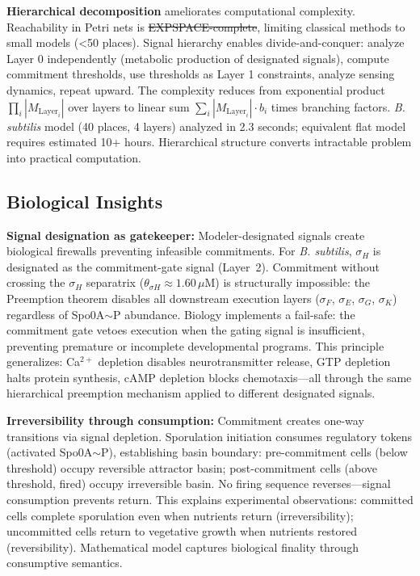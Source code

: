 \documentclass[10pt,letterpaper]{article}
\providecommand{\DIFaddtex}[1]{{\protect\color{blue}\uwave{#1}}} %
\providecommand{\DIFdeltex}[1]{{\protect\color{red}\sout{#1}}}                      %
\providecommand{\DIFaddbegin}{} %
\providecommand{\DIFaddend}{} %
\providecommand{\DIFdelbegin}{} %
\providecommand{\DIFdelend}{} %
\providecommand{\DIFadd}[1]{\texorpdfstring{\DIFaddtex{#1}}{#1}} %
\providecommand{\DIFdel}[1]{\texorpdfstring{\DIFdeltex{#1}}{}} %
\newcommand{\DIFscaledelfig}{0.5}
\newlength{\DIFdelgraphicswidth} %
\newlength{\DIFdelgraphicsheight} %
\newcommand{\DIFaddincludegraphics}[2][]{{\color{blue}\fbox{\DIFOincludegraphics[#1]{#2}}}} %
\newcommand{\DIFdelincludegraphics}[2][]{%
\sbox{\DIFdelgraphicsbox}{\DIFOincludegraphics[#1]{#2}}%
\settoboxwidth{\DIFdelgraphicswidth}{\DIFdelgraphicsbox} %
\settoboxtotalheight{\DIFdelgraphicsheight}{\DIFdelgraphicsbox} %
\scalebox{\DIFscaledelfig}{%
\parbox[b]{\DIFdelgraphicswidth}{\usebox{\DIFdelgraphicsbox}\\[-\baselineskip] \rule{\DIFdelgraphicswidth}{0em}}\llap{\resizebox{\DIFdelgraphicswidth}{\DIFdelgraphicsheight}{%
\setlength{\unitlength}{\DIFdelgraphicswidth}%
\begin{picture}(1,1)%
\thicklines\linethickness{2pt} %
{\color[rgb]{1,0,0}\put(0,0){\framebox(1,1){}}}%
{\color[rgb]{1,0,0}\put(0,0){\line( 1,1){1}}}%
{\color[rgb]{1,0,0}\put(0,1){\line(1,-1){1}}}%
\end{picture}%
}\hspace*{3pt}}} %
} %
\DeclareRobustCommand{\DIFaddbegin}{\DIFOaddbegin \let\includegraphics\DIFaddincludegraphics} %
\DeclareRobustCommand{\DIFaddend}{\DIFOaddend \let\includegraphics\DIFOincludegraphics} %
\DeclareRobustCommand{\DIFdelbegin}{\DIFOdelbegin \let\includegraphics\DIFdelincludegraphics} %
\DeclareRobustCommand{\DIFdelend}{\DIFOaddend \let\includegraphics\DIFOincludegraphics} %
\begin{document}
\textbf{Hierarchical decomposition} ameliorates computational complexity. Reachability in Petri nets is \DIFdelbegin \DIFdel{EXPSPACE-complete}\DIFdelend \DIFaddbegin \DIFadd{Ackermann-complete~\mbox{%
\cite{czerwinski2021}}\hskip0pt%
}\DIFaddend , limiting classical methods to small models (<50 places). Signal hierarchy enables divide-and-conquer: analyze Layer 0 independently (metabolic production of designated signals), compute commitment thresholds, use thresholds as Layer 1 constraints, analyze sensing dynamics, repeat upward. The complexity reduces from exponential product $\prod_i |M_{\text{Layer}_i}|$ over layers to linear sum $\sum_i |M_{\text{Layer}_i}| \cdot b_i$ times branching factors. \textit{B. subtilis} model (40 places, 4 layers) analyzed in 2.3 seconds; equivalent flat model requires estimated 10+ hours. Hierarchical structure converts intractable problem into practical computation.

\subsection{Biological Insights}

\textbf{Signal designation as gatekeeper:} Modeler-designated signals create biological firewalls preventing infeasible commitments. For \textit{B. subtilis}, $\sigma_H$ is designated as the commitment-gate signal (Layer~2). Commitment without crossing the $\sigma_H$ separatrix ($\theta_{\sigma H} \approx 1.60\,\mu$M) is structurally impossible: the Preemption theorem disables all downstream execution layers ($\sigma_F$, $\sigma_E$, $\sigma_G$, $\sigma_K$) regardless of Spo0A$\sim$P abundance. Biology implements a fail-safe: the commitment gate vetoes execution when the gating signal is insufficient, preventing premature or incomplete developmental programs. This principle generalizes: Ca$^{2+}$ depletion disables neurotransmitter release, GTP depletion halts protein synthesis, cAMP depletion blocks chemotaxis---all through the same hierarchical preemption mechanism applied to different designated signals.

\textbf{Irreversibility through consumption:} Commitment creates one-way transitions via signal depletion. Sporulation initiation consumes regulatory tokens (activated Spo0A$\sim$P), establishing basin boundary: pre-commitment cells (below threshold) occupy reversible attractor basin; post-commitment cells (above threshold, fired) occupy irreversible basin. No firing sequence reverses---signal consumption prevents return. This explains experimental observations: committed cells complete sporulation even when nutrients return (irreversibility); uncommitted cells return to vegetative growth when nutrients restored (reversibility). Mathematical model captures biological finality through consumptive semantics.
\end{document}
